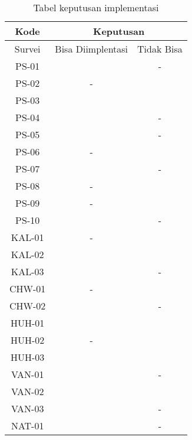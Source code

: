 \begin{table}[H]
	\caption {Tabel keputusan implementasi} \label{tab:keputusan}
	\begin{center}
		\begin{tabular}{|c|c|c|}
		\hline 
		Kode & \multicolumn{2}{c|}{Keputusan} \\ 
		\hline 
		Survei & Bisa Diimplentasi & Tidak Bisa \\ 
		\hline 
		PS-01 & \checkmark & - \\ 
		\hline 
		PS-02 & - & \checkmark \\ 
		\hline 
		PS-03 &  &  \\ 
		\hline 
		PS-04 & \checkmark & - \\ 
		\hline 
		PS-05 & \checkmark & - \\ 
		\hline 
		PS-06 & - & \checkmark \\ 
		\hline 
		PS-07 & \checkmark & - \\ 
		\hline 
		PS-08 & - & \checkmark \\ 
		\hline 
		PS-09 & - & \checkmark \\ 
		\hline 
		PS-10 & \checkmark & - \\ 
		\hline 
		KAL-01 & - & \checkmark \\ 
		\hline 
		KAL-02 &  &  \\ 
		\hline 
		KAL-03 & \checkmark & - \\ 
		\hline 
		CHW-01 & - & \checkmark \\ 
		\hline 
		CHW-02 & \checkmark & - \\ 
		\hline 
		HUH-01 &  &  \\ 
		\hline 
		HUH-02 & - & \checkmark \\ 
		\hline 
		HUH-03 &  &  \\ 
		\hline 
		VAN-01 & \checkmark & - \\ 
		\hline 
		VAN-02 &  &  \\ 
		\hline 
		VAN-03 & \checkmark & - \\ 
		\hline 
		NAT-01 & \checkmark & - \\ 
		\hline
		\end{tabular} 
	\end{center}
\end{table}